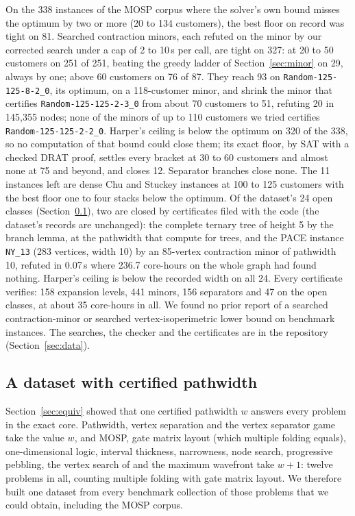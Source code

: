On the 338 instances of the MOSP corpus where the solver's own bound misses
the optimum by two or more (20 to 134 customers), the best floor on record was
tight on 81. Searched contraction minors, each refuted on the minor by our
corrected search under a cap of 2 to 10\,s per call, are tight on 327: at 20
to 50 customers on 251 of 251, beating the greedy ladder of
Section~\ref{sec:minor} on 29, always by one; above 60 customers on 76 of 87.
They reach 93 on \texttt{Random-125-125-8-2\_0}, its optimum, on a 118-customer
minor, and shrink the minor that certifies \texttt{Random-125-125-2-3\_0} from
about 70 customers to 51, refuting 20 in 145,355 nodes; none of the minors
of up to 110 customers we tried certifies \texttt{Random-125-125-2-2\_0}.
Harper's ceiling is below the optimum on 320 of the 338, so no computation of
that bound could close them; its exact floor, by SAT with a checked DRAT
proof, settles every bracket at 30 to 60 customers and almost none at 75 and
beyond, and closes 12. Separator branches close none. The 11 instances left
are dense Chu and Stuckey instances at 100 to 125 customers with the best
floor one to four stacks below the optimum. Of the dataset's 24 open classes
(Section~\ref{sec:dataset}), two are closed by certificates filed with the
code (the dataset's records are unchanged): the complete ternary tree of
height 5 by the branch lemma, at the pathwidth that \citet{EllisSudboroughTurner1994}
compute for trees, and the PACE instance \texttt{NY\_13} (283 vertices, width
10) by an 85-vertex contraction minor of pathwidth 10, refuted in 0.07\,s
where 236.7 core-hours on the whole graph had found nothing. Harper's ceiling
is below the recorded width on all 24. Every certificate verifies: 158
expansion levels, 441 minors, 156 separators and 47 on the open classes, at
about 35 core-hours in all. We found no prior report of a searched
contraction-minor or searched vertex-isoperimetric lower bound on benchmark
instances. The searches, the checker and the certificates are in the
repository (Section~\ref{sec:data}).

\subsection{A dataset with certified pathwidth}
\label{sec:dataset}

Section~\ref{sec:equiv} showed that one certified pathwidth $w$ answers every
problem in the exact core. Pathwidth, vertex separation and the vertex
separator game take the value $w$, and MOSP, gate matrix layout (which
multiple folding equals), one-dimensional logic, interval thickness,
narrowness, node search, progressive pebbling, the vertex search of
\citet{BRST1991} and the maximum wavefront take $w+1$: twelve problems in all, counting multiple folding with gate matrix layout. We therefore built one dataset from every benchmark collection of
those problems that we could obtain, including the MOSP corpus.

